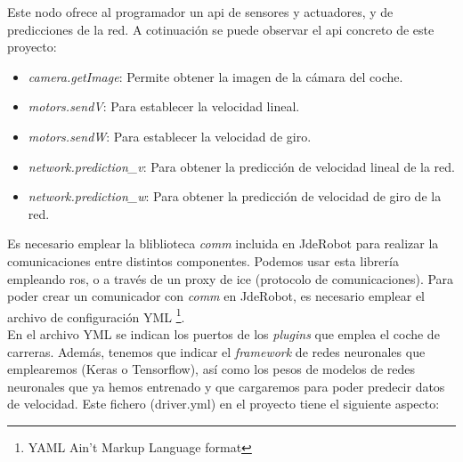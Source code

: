 Este nodo ofrece al programador un \acrfull{api} de sensores y actuadores, y de predicciones de la red. A cotinuación se puede observar el \acrshort{api} concreto de este proyecto:

\begin{itemize}
    \item \textit{camera.getImage}: Permite obtener la imagen de la cámara del coche.
    
    \item \textit{motors.sendV}: Para establecer la velocidad lineal.
    
    \item \textit{motors.sendW}: Para establecer la velocidad de giro.
    
    \item \textit{network.prediction\_v}: Para obtener la predicción de velocidad lineal de la red.
    
    \item \textit{network.prediction\_w}: Para obtener la predicción de velocidad de giro de la red.
\end{itemize}

Es necesario emplear la bliblioteca \textit{comm} incluida en JdeRobot para realizar la comunicaciones entre distintos componentes. Podemos usar esta librería empleando \acrshort{ros}, o a través de un proxy de \acrshort{ice} (protocolo de comunicaciones). Para poder crear un comunicador con \textit{comm} en JdeRobot, es necesario emplear el archivo de configuración YML \footnote{YAML Ain't Markup Language format}.\\

En el archivo YML se indican los puertos de los \textit{plugins} que emplea el coche de carreras. Además, tenemos que indicar el \textit{framework} de redes neuronales que emplearemos (Keras o Tensorflow), así como los pesos de modelos de redes neuronales que ya hemos entrenado y que cargaremos para poder predecir datos de velocidad. Este fichero (driver.yml) en el proyecto tiene el siguiente aspecto:\\


